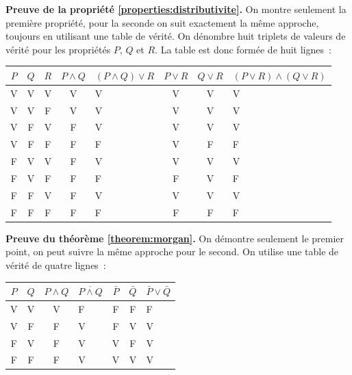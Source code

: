 \documentclass[10pt,notheorems]{beamer}
\theoremstyle{plain}
\theoremstyle{definition} %
\begin{document}
  \begin{notes}
    \mbox{}
    \textbf{Preuve de la propriété \hyperlink{slide_disjonction_conjonction_et_negation}{\ref{properties:distributivite}}.}
    On montre seulement la première propriété, pour la seconde on suit
    exactement la même approche, toujours en utilisant une table de
    vérité. On dénombre huit triplets de valeurs de vérité pour les
    propriétés $P$, $Q$ et $R$. La table est donc formée de huit
    lignes~:
    \begin{table}[H]
      \centering
      \begin{tabular}[H]{|ccc|cgccg|}
        \hline
        $P$ & $Q$ & $R$ & $P\land Q$ & $(P\land Q)\lor R$ & $P\lor R$ & $Q \lor R$ & $(P\lor R)\land (Q \lor R)$ \\ \hline
        V & V & V & V & V & V & V & V \\
        V & V & F & V & V & V & V & V \\
        V & F & V & F & V & V & V & V \\
        V & F & F & F & F & V & F & F \\
        F & V & V & F & V & V & V & V \\
        F & V & F & F & F & F & V & F \\
        F & F & V & F & V & V & V & V \\
        F & F & F & F & F & F & F & F \\
        \hline\hline
      \end{tabular}
    \end{table}

    \bigskip\bigskip

    \textbf{Preuve du théorème \hyperlink{slide_disjonction_conjonction_et_negation}{\ref{theorem:morgan}}.} On démontre seulement le premier point, on peut suivre la même approche pour le second. On utilise une table de vérité de quatre lignes~:
    \begin{table}[H]
      \centering
      \begin{tabular}[H]{|cc|cgccg|}
        \hline
        $P$ & $Q$ & $P\land Q$ & $\overline{P\land Q}$ & $\bar P$ & $\bar Q$ & $\bar P \lor \bar Q$ \\ \hline
        V & V & V & F & F & F & F\\
        V & F & F & V & F & V & V\\
        F & V & F & V & V & F & V\\
        F & F & F & V & V & V & V\\
        \hline\hline
      \end{tabular}
    \end{table}

    \vspace*{\fill}

  \end{notes}
\end{document}
